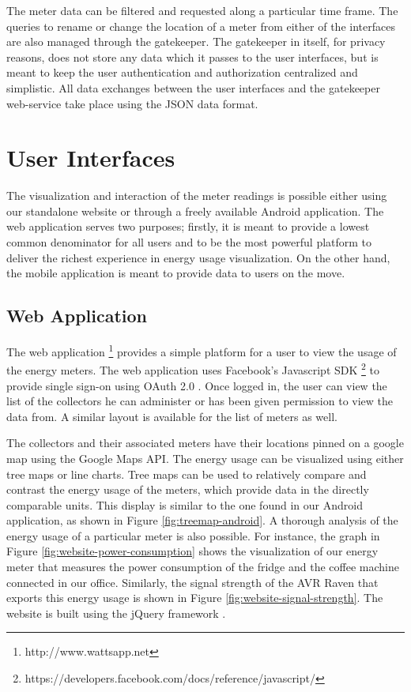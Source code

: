 \documentclass[10pt, conference, compsocconf]{IEEEtran}
\begin{document}
The meter data can be filtered and requested along a particular time
frame. The queries to rename or change the location of a meter from
either of the interfaces are also managed through the gatekeeper.
The gatekeeper in itself, for privacy reasons, does not store any
data which it passes to the user interfaces, but is meant to keep
the user authentication and authorization centralized and simplistic.
All data exchanges between the user interfaces and the gatekeeper
web-service take place using the JSON data format.

\section{User Interfaces}

The visualization and interaction of the meter readings is possible
either using our standalone website or through a freely available
Android application. The web application serves two purposes; firstly,
it is meant to provide a lowest common denominator for all users and
to be the most powerful platform to deliver the richest experience
in energy usage visualization. On the other hand, the mobile application
is meant to provide data to users on the move.


\subsection{Web Application}

The web application%
\footnote{http://www.wattsapp.net%
} provides a simple platform for a user to view the usage of the energy
meters. The web application uses Facebook's Javascript SDK %
\footnote{https://developers.facebook.com/docs/reference/javascript/%
} to provide single sign-on using OAuth 2.0 \cite{oauth}. Once logged
in, the user can view the list of the collectors he can administer
or has been given permission to view the data from. A similar layout
is available for the list of meters as well.

The collectors and their associated meters have their locations pinned
on a google map using the Google Maps API. The energy usage can be
visualized using either tree maps or line charts. Tree maps can be
used to relatively compare and contrast the energy usage of the meters,
which provide data in the directly comparable units. This display
is similar to the one found in our Android application, as shown in
Figure \ref{fig:treemap-android}. A thorough analysis of the energy
usage of a particular meter is also possible. For instance, the graph
in Figure \ref{fig:website-power-consumption} shows the visualization
of our energy meter that measures the power consumption of the fridge
and the coffee machine connected in our office. Similarly, the signal
strength of the AVR Raven that exports this energy usage is shown
in Figure \ref{fig:website-signal-strength}. The website is built
using the jQuery framework \cite{Bibeault:2008:JA:1407181}.
\end{document}

